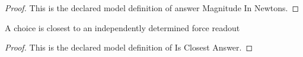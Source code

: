 \begin{proof}
  This is the declared model definition of answer Magnitude In Newtons.
\end{proof}
\begin{definition}
  \label{def:physics:phyx-mini-0784:phyxminiproblems-problemphyxmini0784-isclosestanswer}
  A choice is closest to an independently determined force readout
\end{definition}
\begin{proof}
  This is the declared model definition of Is Closest Answer.
\end{proof}
